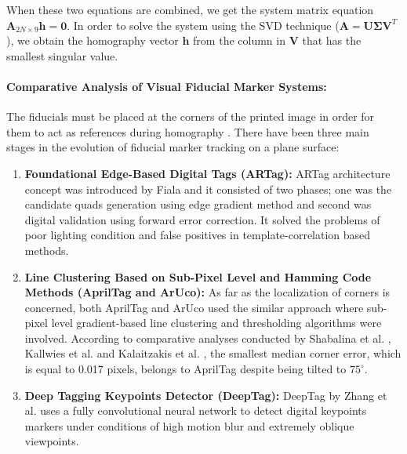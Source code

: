 When these two equations are combined, we get the system matrix equation $\mathbf{A}_{2N \times 9} \mathbf{h} = \mathbf{0}$. In order to solve the system using the SVD technique ($\mathbf{A} = \mathbf{U} \mathbf{\Sigma} \mathbf{V}^T$), we obtain the homography vector $\mathbf{h}$ from the column in $\mathbf{V}$ that has the smallest singular value.

\paragraph{Comparative Analysis of Visual Fiducial Marker Systems:}
The fiducials must be placed at the corners of the printed image in order for them to act as references during homography \cite{Fiala2010Designing, Wang2016AprilTag2, Kallwies2020Determining, Shabalina2018ARTag, Kalaitzakis2021Fiducial, GarridoJurado2026ArUco, Zhang2022DeepTag}. There have been three main stages in the evolution of fiducial marker tracking on a plane surface:
\begin{enumerate}
    \item \textbf{Foundational Edge-Based Digital Tags (ARTag):} ARTag architecture concept was introduced by Fiala \cite{Fiala2010Designing} and it consisted of two phases; one was the candidate quads generation using edge gradient method and second was digital validation using forward error correction. It solved the problems of poor lighting condition and false positives in template-correlation based methods.
    \item \textbf{Line Clustering Based on Sub-Pixel Level and Hamming Code Methods (AprilTag and ArUco):} As far as the localization of corners is concerned, both AprilTag \cite{Wang2016AprilTag2} and ArUco \cite{GarridoJurado2026ArUco} used the similar approach where sub-pixel level gradient-based line clustering and thresholding algorithms were involved. According to comparative analyses conducted by Shabalina et al. \cite{Shabalina2018ARTag}, Kallwies et al. \cite{Kallwies2020Determining} and Kalaitzakis et al. \cite{Kalaitzakis2021Fiducial}, the smallest median corner error, which is equal to 0.017 pixels, belongs to AprilTag despite being tilted to $75^\circ$.
    \item \textbf{Deep Tagging Keypoints Detector (DeepTag):} DeepTag by Zhang et al. \cite{Zhang2022DeepTag} uses a fully convolutional neural network to detect digital keypoints markers under conditions of high motion blur and extremely oblique viewpoints.
\end{enumerate}

